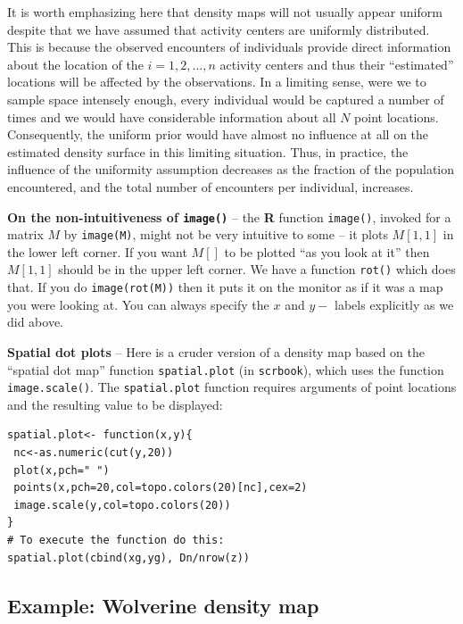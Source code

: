 {It is worth emphasizing here that density maps will not usually appear
uniform despite that we have assumed that activity centers are
uniformly distributed. This is because the observed encounters of
individuals provide direct information about the location of the
$i=1,2,\ldots,n$ activity centers and thus their ``estimated''
locations will be affected by the observations. In a limiting sense,
were we to sample space intensely enough, every individual would be
captured a number of times and we would have considerable information
about all $N$ point locations. Consequently, the uniform prior would
have almost no influence at all on the estimated density surface in
this limiting situation. Thus, in practice, the influence of the
uniformity assumption decreases as the fraction of the population
encountered, and the total number of encounters per individual, increases.

{\bf On the non-intuitiveness of \mbox{\tt image()} } -- the {\bf R}
function \mbox{\tt image()}, invoked for a matrix $M$ by \mbox{\tt image(M)}, might
not be very intuitive to some -- it plots $M[1,1]$ in the lower left
corner. If you want $M[]$ to be plotted ``as
you look at it'' then $M[1,1]$ should be in the upper left corner.  We
have a function \mbox{\tt rot()} which does that. If you do \mbox{\tt image(rot(M))} then it
puts it on the monitor as if it was a map you were looking at.  You
can always specify the $x$ and $y-$ labels explicitly as we did above.

{\bf Spatial dot plots } -- Here is a cruder version of a density map based on the
``spatial dot map'' function \mbox{\tt spatial.plot} (in
\mbox{\tt scrbook}), which uses
the function \mbox{\tt image.scale()}.
The \mbox{\tt spatial.plot} function requires arguments of point
locations and the resulting value to be displayed:
\begin{verbatim}
spatial.plot<- function(x,y){
 nc<-as.numeric(cut(y,20))
 plot(x,pch=" ")
 points(x,pch=20,col=topo.colors(20)[nc],cex=2)
 image.scale(y,col=topo.colors(20))
}
# To execute the function do this:
spatial.plot(cbind(xg,yg), Dn/nrow(z))
\end{verbatim}

\subsection{Example: Wolverine density map}

}
